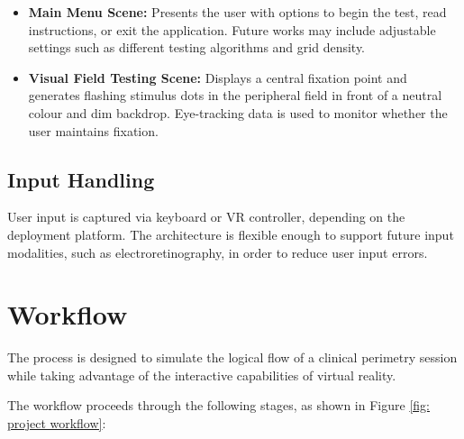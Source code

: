 \documentclass{l4proj}
\begin{document}
\begin{itemize}
    \item \textbf{Main Menu Scene:} \newline
         Presents the user with options to begin the test, read instructions, or exit the application. Future works may include adjustable settings such as different testing algorithms and grid density.

    \item \textbf{Visual Field Testing Scene:} \newline
        Displays a central fixation point and generates flashing stimulus dots in the peripheral field in front of a neutral colour and dim backdrop. Eye-tracking data is used to monitor whether the user maintains fixation.
\end{itemize}

\subsection{Input Handling}
User input is captured via keyboard or VR controller, depending on the deployment platform. The architecture is flexible enough to support future input modalities, such as electroretinography, in order to reduce user input errors.

\section{Workflow}  
The process is designed to simulate the logical flow of a clinical perimetry session while taking advantage of the interactive capabilities of virtual reality.

The workflow proceeds through the following stages, as shown in Figure \ref{fig: project workflow}: 
\end{document}
